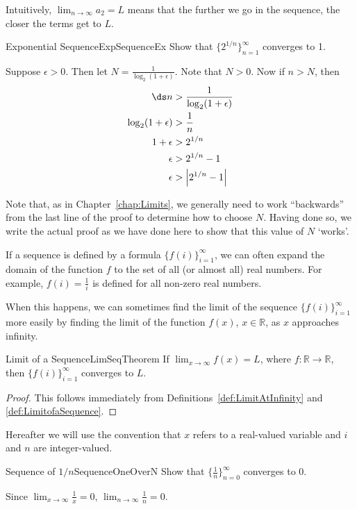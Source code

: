 Intuitively, $\lim_{n\to\infty}a_2=L$ means that the further we go in the sequence, the closer the terms get to $L$.

\begin{example}{Exponential Sequence}{ExpSequenceEx}
Show that $\{2^{1/n}\}_{n=1}^{\infty}$ converges to 1.
\end{example}
\begin{solution}
Suppose $\epsilon>0$. Then let $N=\frac{1}{\log_2(1+\epsilon)}$. Note that $N>0$. Now if $n>N$, then
\begin{align*}
\ds n&>\frac{1}{\log_2(1+\epsilon)}	\\
\log_2(1+\epsilon)&>\frac{1}{n}\\
1+\epsilon&>2^{1/n}	\\
\epsilon&>2^{1/n}-1	\\
\epsilon&>\left|2^{1/n}-1\right|
\end{align*}
\end{solution}

Note that, as in Chapter~\ref{chap:Limits}, we generally need to work ``backwards'' from the last line of the proof to determine how to choose $N$. Having done so, we write the actual proof as we have done here to show that this value of $N$ `works'.

If a sequence is defined by a formula $\{f(i)\}_{i=1}^{\infty}$, we can often expand the domain of the function $f$ to the set of all (or almost all) real numbers. For example, $f(i)=\frac{1}{i}$ is defined for all non-zero real numbers.

When this happens, we can sometimes find the limit of the sequence $\{f(i)\}_{i=1}^{\infty}$ more easily by finding the limit of the function $f(x)$, $x\in\mathbb{R}$, as $x$ approaches infinity.

\begin{theorem}{Limit of a Sequence}{LimSeqTheorem}
If $\lim_{x\to\infty}f(x)=L$, where $f:\mathbb{R}\to\mathbb{R}$, then $\{f(i)\}_{i=1}^{\infty}$ converges to $L$.
\end{theorem}
\begin{proof}
This follows immediately from Definitions~\ref{def:LimitAtInfinity} and \ref{def:LimitofaSequence}.
\end{proof}

Hereafter we will use the convention that $x$ refers to a real-valued variable and $i$ and $n$ are integer-valued.

\begin{example}{Sequence of $1/n$}{SequenceOneOverN}
Show that $\{\frac{1}{n}\}_{n=0}^{\infty}$ converges to 0.
\end{example}
\begin{solution}
Since $\lim_{x\to\infty}\frac{1}{x}=0$, $\lim_{n\to\infty}\frac{1}{n}=0$.
\end{solution}

